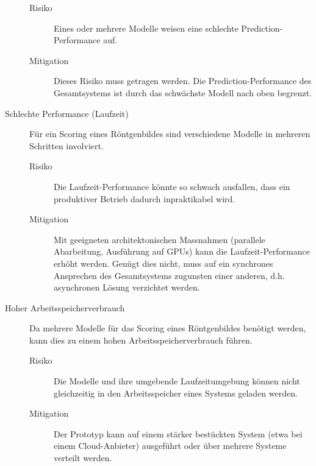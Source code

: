 \begin{description}
        \begin{description}
            \item[Risiko] Eines oder mehrere Modelle weisen eine schlechte Prediction-Performance auf.
            \item[Mitigation] Dieses Risiko muss getragen werden. Die Prediction-Performance des Gesamtsystems ist durch das schwächste Modell nach oben begrenzt.
        \end{description}
    \item[Schlechte Performance (Laufzeit)] Für ein Scoring eines Röntgenbildes sind verschiedene Modelle in mehreren Schritten involviert.
        \begin{description}
            \item[Risiko] Die Laufzeit-Performance könnte so schwach ausfallen, dass ein produktiver Betrieb dadurch inpraktikabel wird.
            \item[Mitigation] Mit geeigneten architektonischen Massnahmen (parallele Abarbeitung, Ausführung auf GPUs) kann die Laufzeit-Performance erhöht werden. Genügt dies nicht, muss auf ein synchrones Ansprechen des Gesamtsystems zugunsten einer anderen, d.h. asynchronen Lösung verzichtet werden.
        \end{description}
    \item[Hoher Arbeitsspeicherverbrauch] Da mehrere Modelle für das Scoring eines Röntgenbildes benötigt werden, kann dies zu einem hohen Arbeitsspeicherverbrauch führen.
        \begin{description}
            \item[Risiko] Die Modelle und ihre umgebende Laufzeitumgebung können nicht gleichzeitig in den Arbeitsspeicher  eines Systems geladen werden.
            \item[Mitigation] Der Prototyp kann auf einem stärker bestückten System (etwa bei einem Cloud-Anbieter) ausgeführt oder über mehrere Systeme verteilt werden.
        \end{description}
\end{description}
